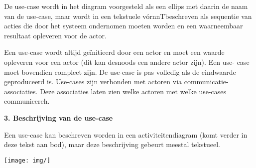 De use-case wordt in het diagram voorgesteld als een ellips met daarin de naam van de use-case, maar wordt in een tekstuele vórnnTbeschreven als sequentie van acties die door het systeem ondernomen moeten worden en een waarneembaar resultaat opleveren voor de actor.

Een use-case wordt altijd geïnitieerd door een actor en moet een waarde opleveren voor een actor (dit kan desnoods een andere actor zijn). Een use- case moet bovendien compleet zijn. De use-case is pas volledig als de eindwaarde geproduceerd is.
Use-cases zijn verbonden met actoren via communicatie-associaties. Deze associaties laten zien welke actoren met welke use-cases communicereh.

\textbf{3. Beschrijving van de use-case}

Een use-case kan beschreven worden in een activiteitendiagram (komt verder in deze tekst aan bod), maar deze beschrijving gebeurt meestal tekstueel.


\begin{center}
\texttt{[image: img/]}%
\label{labelname}%
\end{center}

